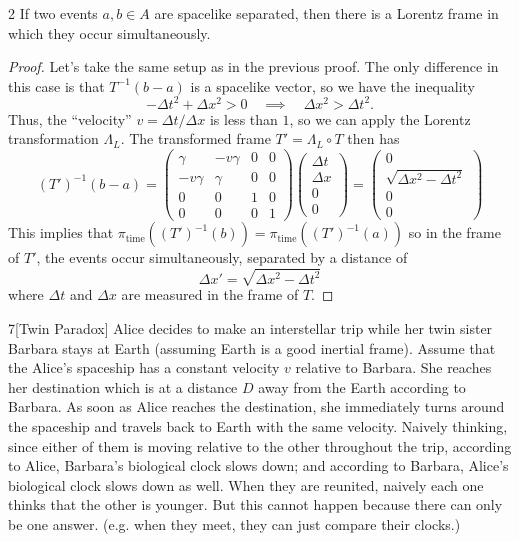 \documentclass{../../templates/lkx_pset}
\begin{document}
\begin{parts}
	\begin{claim}{2}
		If two events $a,b\in A$ are spacelike separated, then there is a Lorentz frame in which they occur simultaneously.
	\end{claim}
	\begin{proof}
		Let's take the same setup as in the previous proof. The only difference in this case is that $T^{-1}(b-a)$ is a spacelike vector, so we have the inequality
		\[
			-\Delta t^2 + \Delta x^2 > 0 \quad\implies\quad \Delta x^2 > \Delta t^2.
		\]
		Thus, the ``velocity'' $v = \Delta t/\Delta x$ is less than $1$, so we can apply the Lorentz transformation $\Lambda_L$. The transformed frame $T' = \Lambda_L \circ T$ then has
		\[
			(T')^{-1}(b-a) =
			\begin{pmatrix}
				\gamma   & -v\gamma & 0 & 0 \\
				-v\gamma & \gamma   & 0 & 0 \\
				0        & 0        & 1 & 0 \\
				0        & 0        & 0 & 1
			\end{pmatrix}\begin{pmatrix}\Delta t\\\Delta x\\0\\0\end{pmatrix}
			=\begin{pmatrix}0\\ \sqrt{\Delta x^2 - \Delta t^2}\\0\\0\end{pmatrix}
		\]
		This implies that $\pi_{\textrm{time}}((T')^{-1}(b)) = \pi_{\textrm{time}}((T')^{-1}(a))$ so in the frame of $T'$, the events occur simultaneously, separated by a distance of \[\Delta x' = \sqrt{\Delta x^2 - \Delta t^2}\]
		where $\Delta t$ and $\Delta x$ are measured in the frame of $T$.
	\end{proof}
\end{parts}

\begin{problem}{7}[Twin Paradox]
Alice decides to make an interstellar trip while her twin sister Barbara stays at
Earth (assuming Earth is a good inertial frame). Assume that the Alice's spaceship has a constant
velocity $v$ relative to Barbara. She reaches her destination which is at a distance $D$ away from the
Earth according to Barbara. As soon as Alice reaches the destination, she immediately turns around
the spaceship and travels back to Earth with the same velocity.
Naively thinking, since either of them is moving relative to the other throughout the trip, according
to Alice, Barbara’s biological clock slows down; and according to Barbara, Alice’s biological clock
slows down as well. When they are reunited, naively each one thinks that the other is younger.
But this cannot happen because there can only be one answer. (e.g. when they meet, they can just
compare their clocks.)
\end{problem}
\end{document}
